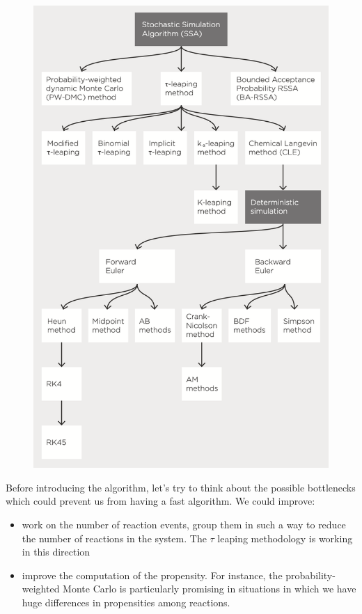 \begin{figure}
  \centering \includegraphics{SSA_tree.png}
\end{figure}

Before introducing the algorithm, let's try to think about the possible bottlenecks which could prevent us from having a fast algorithm.
We could improve:

\begin{itemize}
  \item work on the number of reaction events, group them in such a way to reduce the number of reactions in the system.
    The $\tau$ leaping methodology is working in this direction \item improve the computation of the propensity.
    For instance, the probability-weighted Monte Carlo is particularly promising in situations in which we have huge differences in propensities among reactions.
\end{itemize}

